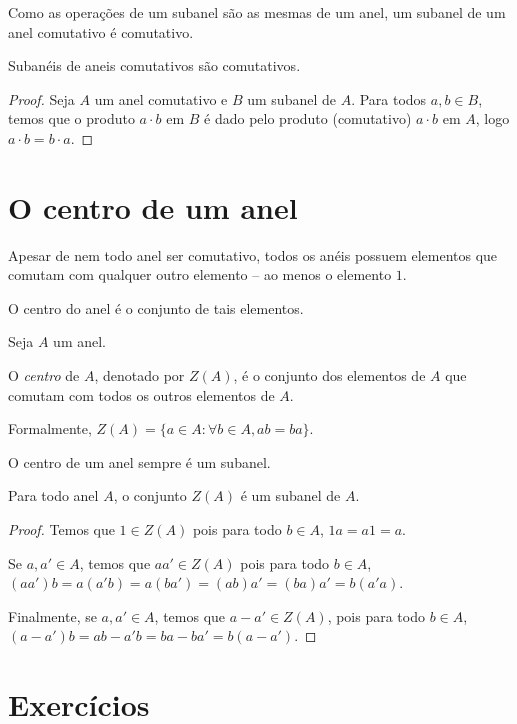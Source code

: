 Como as operações de um subanel são as mesmas de um anel, um subanel de um anel comutativo é comutativo.

\begin{prop}
    Subanéis de aneis comutativos são comutativos.
\end{prop}
\begin{proof}
Seja $A$ um anel comutativo e $B$ um subanel de $A$. Para todos $a, b \in B$, temos que o produto $a\cdot b$ em $B$ é dado pelo produto (comutativo) $a\cdot b$ em $A$, logo $a\cdot b=b\cdot a$.
\end{proof}

\section{O centro de um anel}
Apesar de nem todo anel ser comutativo, todos os anéis possuem elementos que comutam com qualquer outro elemento -- ao menos o elemento $1$.

O centro do anel é o conjunto de tais elementos.

\begin{definition}
    Seja $A$ um anel.

    O \emph{centro} de $A$, denotado por $Z(A)$, é o conjunto dos elementos de $A$ que comutam com todos os outros elementos de $A$.

    Formalmente, $Z(A)=\{a \in A: \forall b \in A, ab=ba\}$.
\end{definition}

O centro de um anel sempre é um subanel.

\begin{prop}
    Para todo anel $A$, o conjunto $Z(A)$ é um subanel de $A$.
\end{prop}

\begin{proof}
    Temos que $1 \in Z(A)$ pois para todo $b \in A$, $1a=a1=a$.

    Se $a, a' \in A$, temos que $aa' \in Z(A)$ pois para todo $b \in A$, $(aa')b=a(a'b)=a(ba')=(ab)a'=(ba)a'=b(a'a)$.

    Finalmente, se $a, a' \in A$, temos que $a-a' \in Z(A)$, pois para todo $b \in A$, $(a-a')b=ab-a'b=ba-ba'=b(a-a')$.
\end{proof}



\section{Exercícios}

